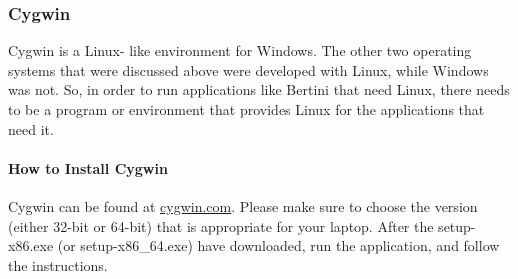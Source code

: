 	\subsubsection{Cygwin}
Cygwin is a Linux- like environment for Windows. The other two operating systems that were discussed above were developed with Linux, while Windows was not. So, in order to run applications like Bertini that need Linux, there needs to be a program or environment that provides Linux for the applications that need it. 

	\paragraph*{How to Install Cygwin}

Cygwin can be found at \href{https://cygwin.com/install.html}{cygwin.com}. Please make sure to choose the version (either 32-bit or 64-bit) that is appropriate for your laptop. After the setup-x86.exe (or setup-x86\_64.exe) have downloaded, run the application, and follow the instructions.

